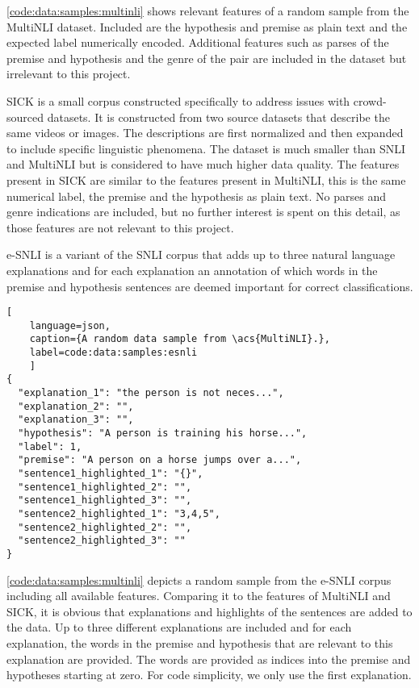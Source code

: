 \autoref{code:data:samples:multinli} shows relevant features of a random sample from the \ac{MultiNLI} dataset. Included are the hypothesis and premise as plain text and the expected label numerically encoded. Additional features such as parses of the premise and hypothesis and the genre of the pair are included in the dataset but irrelevant to this project.

\Acf{SICK} \cite{sick} is a small corpus constructed specifically to address issues with crowd-sourced datasets. It is constructed from two source datasets that describe the same videos or images. The descriptions are first normalized and then expanded to include specific linguistic phenomena. The dataset is much smaller than \acs{SNLI} and \acs{MultiNLI} but is considered to have much higher data quality. The features present in \acs{SICK} are similar to the features present in \acs{MultiNLI}, this is the same numerical label, the premise and the hypothesis as plain text. No parses and genre indications are included, but no further interest is spent on this detail, as those features are not relevant to this project.

\Acf{e-SNLI} \cite{esnli} is a variant of the \acs{SNLI} \cite{snli} corpus that adds up to three natural language explanations and for each explanation an annotation of which words in the premise and hypothesis sentences are deemed important for correct classifications.

\begin{lstlisting}[
    language=json,
    caption={A random data sample from \acs{MultiNLI}.},
    label=code:data:samples:esnli
    ]
{
  "explanation_1": "the person is not neces...",
  "explanation_2": "",
  "explanation_3": "",
  "hypothesis": "A person is training his horse...",
  "label": 1,
  "premise": "A person on a horse jumps over a...",
  "sentence1_highlighted_1": "{}",
  "sentence1_highlighted_2": "",
  "sentence1_highlighted_3": "",
  "sentence2_highlighted_1": "3,4,5",
  "sentence2_highlighted_2": "",
  "sentence2_highlighted_3": ""
}
\end{lstlisting}

\autoref{code:data:samples:multinli} depicts a random sample from the \acs{e-SNLI} corpus including all available features. Comparing it to the features of \acs{MultiNLI} and \acs{SICK}, it is obvious that explanations and highlights of the sentences are added to the data. Up to three different explanations are included and for each explanation, the words in the premise and hypothesis that are relevant to this explanation are provided. The words are provided as indices into the premise and hypotheses starting at zero. For code simplicity, we only use the first explanation.

